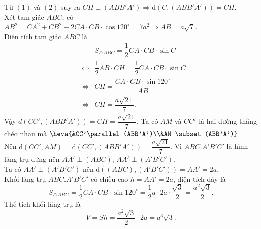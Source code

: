 \begin{ex}
{\begin{itemchoice}
			Từ $(1)$  và $(2)$ suy ra $CH \perp (ABB' A') \Rightarrow \mathrm{d}\left(C,(ABB' A')\right)=CH$.\\
			Xét tam giác $ABC$, có $AB^2=CA^2+CB^2 -2CA\cdot CB \cdot \cos 120^\circ  =7a^2 \Rightarrow AB=a\sqrt{7}$.\\
			Diện tích tam  giác $ABC$ là
			\begin{eqnarray*}
				&&S_{\triangle ABC}=\dfrac{1}{2} CA\cdot CB\cdot \sin C\\ 
				 &\Leftrightarrow& \dfrac{1}{2} AB\cdot CH=\dfrac{1}{2} CA\cdot CB\cdot \sin C\\
				&\Leftrightarrow& CH=\dfrac{CA\cdot  CB \cdot \sin 120^\circ}{AB}\\
				 &\Leftrightarrow&CH=\dfrac{a\sqrt{21}}{7}.
			\end{eqnarray*}
			Vậy  $d (CC', (ABB'A'))=CH=\dfrac{a\sqrt{21}}{7}$.
			\itemch 
			Ta  có $AM$ và $CC'$ là hai đường thẳng chéo nhau mà
			 $\heva{&CC'\parallel (ABB'A')\\&AM \subset (ABB'A')}$\\
			Nên $\mathrm{d}\left(CC', AM\right)=\mathrm{d}\left(CC', (ABB'  A')\right)=\dfrac{a\sqrt{21}}{7}$.
			\itemch 
			Vì $ABC. A'B'C'$ là  hình lăng trụ đứng nên $AA' \perp (ABC)$, $AA' \perp (A'B'C')$.\\
			\itemch 
			 Ta có $AA' \perp (A'B'C')$ nên $\mathrm{d}\left((ABC),(A'B'C')\right)=AA'=2a$.\\
			Khối lăng trụ $ABC. A'B'C'$ có chiều  cao $h=AA'=2a$, diện tích đáy là
			 \[S_{\triangle ABC}=\dfrac{1}{2} CA\cdot CB\cdot \sin 120^\circ=\dfrac{1}{2} a \cdot 2a \cdot \dfrac{\sqrt{3}}{2}=\dfrac{a^2\sqrt{3}}{2}.\]
			Thể tích khối lăng trụ là \[V=Sh=\dfrac{a^2\sqrt{3}}{2} \cdot  2a=a^3\sqrt{3}.\]
		\end{itemchoice}
	 }
\end{ex}

